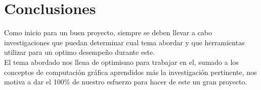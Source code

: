 \documentclass[12pt,journal,compsoc]{IEEEtran}
\begin{document}
%







\section{Conclusiones}

Como inicio para un buen proyecto, siempre se deben llevar a cabo investigaciones que puedan determinar cual tema abordar y que herramientas utilizar para un optimo desempeño durante este.\\
El tema abordado nos llena de optimismo para trabajar en el, sumado a los conceptos de computación gráfica aprendidos más la investigación pertinente, nos motiva a dar el 100\% de nuestro esfuerzo para hacer de este un gran proyecto.

\end{document}
